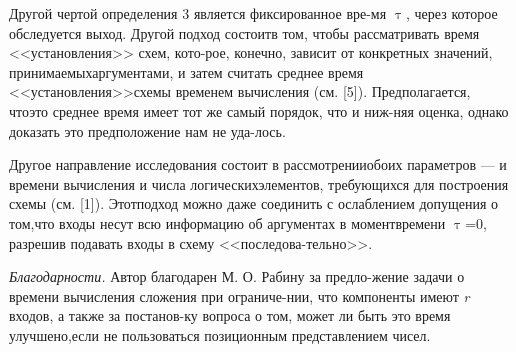 \documentclass[a4paper, twoside]{article}
\begin{document}
\begin{spacing}{0.9}
\par Другой чертой определения 3 является фиксированное вре-\linebreak[4]мя $\uptau$, через которое обследуется выход. Другой подход состоит\linebreak[4] в том, чтобы рассматривать время <<установления>> схем, кото-\linebreak[4]рое, конечно, зависит от конкретных значений, принимаемых\linebreak[4] аргументами, и затем считать среднее время <<установления>>\linebreak[4] схемы временем вычисления (см. [5]). Предполагается, что\linebreak[4] это среднее время имеет тот же самый порядок, что и ниж-\linebreak[4]няя оценка, однако доказать это предположение нам не уда-\linebreak[4]лось.
\end{spacing}

\begin{spacing}{0.9}
\par Другое направление исследования состоит в рассмотрении\linebreak[4] обоих параметров --- и времени вычисления и числа логических\linebreak[4] элементов, требующихся для построения схемы (см. [1]). Этот\linebreak[4] подход можно даже соединить с ослаблением допущения о том,\linebreak[4] что входы несут всю информацию об аргументах в момент\linebreak[4] времени $\uptau$=0, разрешив подавать входы в схему <<последова-\linebreak[4]тельно>>. 
\end{spacing}

\begin{spacing}{0.9}
\par \textit{Благодарности.} Автор благодарен М. О. Рабину за предло-\linebreak[4]жение задачи о времени вычисления сложения при ограниче-\linebreak[4]нии, что компоненты имеют \textit{r} входов, а также за постанов-\linebreak[4]ку вопроса о том, может ли быть это время улучшено,\linebreak[4] если не пользоваться позиционным представлением чисел. 
\end{spacing}
\end{document}
